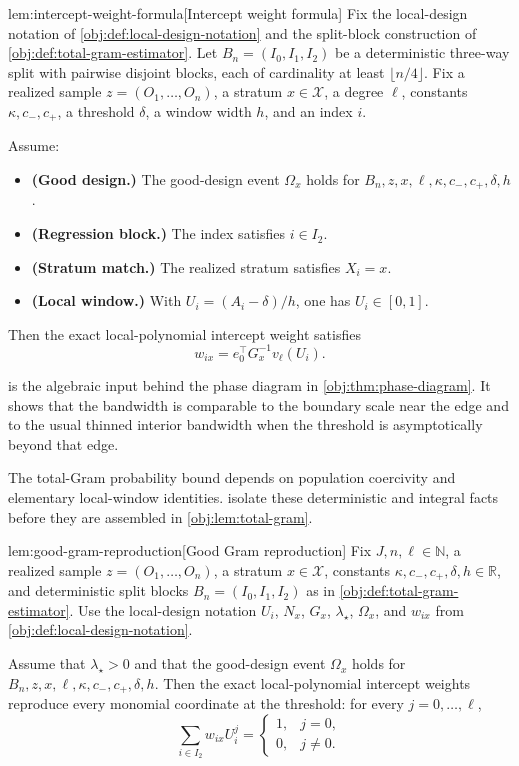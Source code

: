 \begin{lemmav}{lem:intercept-weight-formula}[Intercept weight formula]
Fix the local-design notation of \cref{obj:def:local-design-notation} and the split-block construction of \cref{obj:def:total-gram-estimator}.  Let \(B_n=(I_0,I_1,I_2)\) be a deterministic three-way split with pairwise disjoint blocks, each of cardinality at least \(\lfloor n/4\rfloor\).  Fix a realized sample \(z=(O_1,\ldots,O_n)\), a stratum \(x\in\mathcal X\), a degree \(\ell\), constants \(\kappa,c_-,c_+\), a threshold \(\delta\), a window width \(h\), and an index \(i\).

Assume:
\begin{itemize}
\item \textbf{(Good design.)} The good-design event \(\Omega_x\) holds for \(B_n,z,x,\ell,\kappa,c_-,c_+,\delta,h\).
\item \textbf{(Regression block.)} The index satisfies \(i\in I_2\).
\item \textbf{(Stratum match.)} The realized stratum satisfies \(X_i=x\).
\item \textbf{(Local window.)} With \(U_i=(A_i-\delta)/h\), one has \(U_i\in[0,1]\).
\end{itemize}

Then the exact local-polynomial intercept weight satisfies
\[
w_{ix}=e_0^\top G_x^{-1}v_\ell(U_i).
\]
\end{lemmav}

 is the algebraic input behind the phase diagram in \cref{obj:thm:phase-diagram}. It shows that the bandwidth is comparable to the boundary scale near the edge and to the usual thinned interior bandwidth when the threshold is asymptotically beyond that edge.

The total-Gram probability bound depends on population coercivity and elementary local-window identities.  isolate these deterministic and integral facts before they are assembled in \cref{obj:lem:total-gram}.

\begin{lemmav}{lem:good-gram-reproduction}[Good Gram reproduction]
Fix \(J,n,\ell\in\mathbb N\), a realized sample \(z=(O_1,\ldots,O_n)\), a stratum \(x\in\mathcal X\), constants \(\kappa,c_-,c_+,\delta,h\in\mathbb R\), and deterministic split blocks \(B_n=(I_0,I_1,I_2)\) as in \cref{obj:def:total-gram-estimator}.  Use the local-design notation \(U_i\), \(N_x\), \(G_x\), \(\lambda_\star\), \(\Omega_x\), and \(w_{ix}\) from \cref{obj:def:local-design-notation}.

Assume that \(\lambda_\star>0\) and that the good-design event \(\Omega_x\) holds for \(B_n,z,x,\ell,\kappa,c_-,c_+,\delta,h\).  Then the exact local-polynomial intercept weights reproduce every monomial coordinate at the threshold: for every \(j=0,\ldots,\ell\),
\[
\sum_{i\in I_2} w_{ix} U_i^j
=
\begin{cases}
1, & j=0,\\
0, & j\ne 0.
\end{cases}
\]
\end{lemmav}

